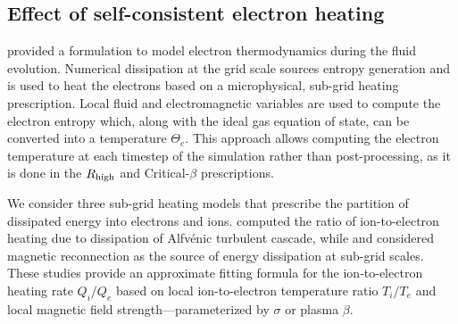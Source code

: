 




\subsection{Effect of self-consistent electron heating}


\citealt{10.1093/mnras/stv2084} provided a formulation to model electron thermodynamics during the fluid evolution. Numerical dissipation at the grid scale sources entropy generation and is used to heat the electrons based on a microphysical, sub-grid heating prescription. Local fluid and electromagnetic variables are used to compute the electron entropy which, along with the ideal gas equation of state, can be converted into a temperature $\Theta_{e}$. This approach allows computing the electron temperature at each timestep of the simulation rather than post-processing, as it is done in the $R_\mathrm{high}$ and Critical-$\beta$ prescriptions.

We consider three sub-grid heating models that prescribe the partition of dissipated energy into electrons and ions.
\citep{2010MNRAS.409L.104H} computed the ratio of ion-to-electron heating due to dissipation of Alfv\'enic turbulent cascade, while \citep{10.1093/mnras/stx2530} and \citep{Rowan_2017} considered magnetic reconnection as the source of energy dissipation at sub-grid scales. These studies provide an approximate fitting formula for the ion-to-electron heating rate $Q_{i}/Q_{e}$ based on local ion-to-electron temperature ratio $T_{i}/T_{e}$ and local magnetic field strength---parameterized by $\sigma$ or plasma $\beta$.

